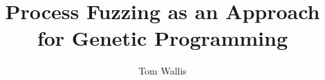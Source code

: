 \author{Tom Wallis}
\date{}
\title{Process Fuzzing as an Approach for Genetic Programming}

\usepackage[obeyDraft,textsize=tiny]{todonotes}
\usepackage{hyperref}
\usepackage{cleveref}
\usepackage[final]{listings}  %



\lstset{language=python}
\lstset{basicstyle=\ttfamily\small}
\lstset{keywordstyle=\ttfamily\bfseries}
\lstset{frame=single}
